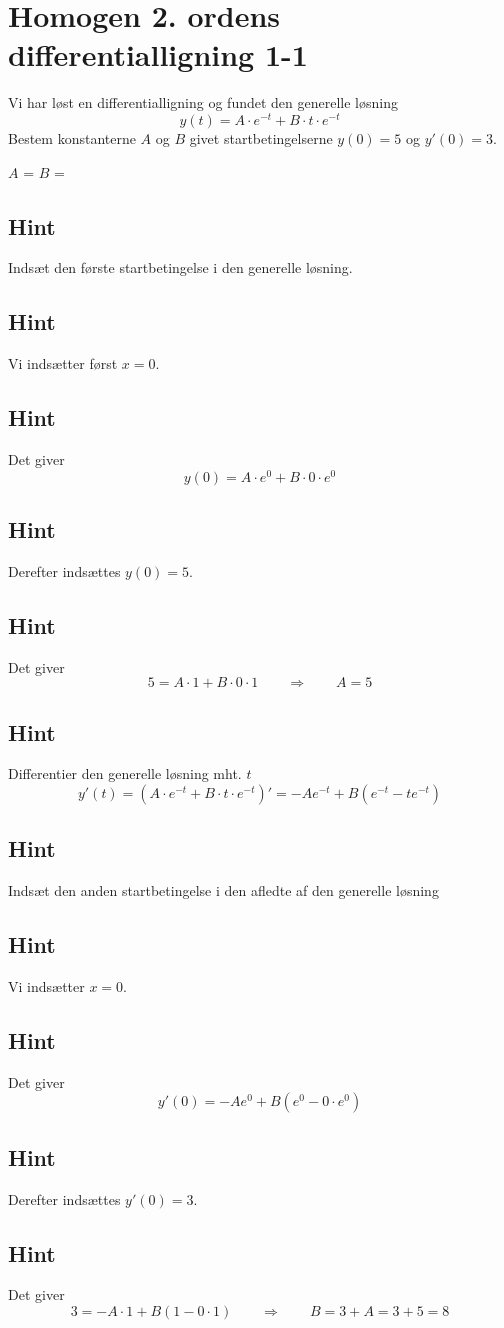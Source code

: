 \documentclass{article}
\newenvironment{exercise}[1]{\newpage\section{#1}}{}
\newcommand{\answerbox}[1]{\fbox{$#1$}}
\newcommand{\hint}{\subsection*{Hint}}
\begin{document}
\tableofcontents
\newpage


\begin{exercise}{Homogen 2. ordens differentialligning 1-1}

Vi har løst en differentialligning og fundet den generelle løsning
\[
y(t) = A \cdot e^{-t} + B \cdot t \cdot e^{-t}
\]
Bestem konstanterne $A$ og $B$ givet startbetingelserne $y(0)=5$ og $y'(0)=3$.


$A$ = \answerbox{5}		$B$ = \answerbox{8}

\hint

Indsæt den første startbetingelse i den generelle løsning. 


\hint

Vi indsætter først $x=0$.

\hint

Det giver
\[
y(0)=  A \cdot e^{0} + B \cdot 0 \cdot e^{0}
\]

\hint

Derefter indsættes $y(0)=5$.

\hint 

Det giver 
\[
5 = A \cdot 1 + B \cdot 0 \cdot 1 \qquad \Rightarrow \qquad A = 5
\]

\hint 

Differentier den generelle løsning mht. $t$
\[
y'(t)= \left(A \cdot e^{-t} + B \cdot t \cdot e^{-t} \right)' = -A e^{-t} + B \left( e^{-t} - t e^{-t} \right)
\]

\hint 

Indsæt den anden startbetingelse i den afledte af den generelle løsning

\hint

Vi indsætter $x=0$.

\hint 

Det giver
\[
y'(0) = -A e^{0} + B \left( e^{0} - 0 \cdot e^{0} \right)
\]

\hint 

Derefter indsættes $y'(0)=3$.

\hint

Det giver
\[
3 = -A \cdot 1 + B \left(1- 0 \cdot 1 \right) \qquad \Rightarrow \qquad B = 3 + A = 3 + 5 = 8
\]






\end{exercise}

\newpage
\end{document}
